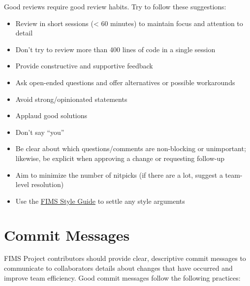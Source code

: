 \documentclass[
]{book}
\providecommand{\tightlist}{%
  \setlength{\itemsep}{0pt}\setlength{\parskip}{0pt}}
\begin{document}
Good reviews require good review habits. Try to follow these suggestions:

\begin{itemize}
\tightlist
\item
  Review in short sessions (\textless{} 60 minutes) to maintain focus and attention to detail
\item
  Don't try to review more than 400 lines of code in a single session
\item
  Provide constructive and supportive feedback
\item
  Ask open-ended questions and offer alternatives or possible workarounds
\item
  Avoid strong/opinionated statements
\item
  Applaud good solutions
\item
  Don't say ``you''
\item
  Be clear about which questions/comments are non-blocking or unimportant; likewise, be explicit when approving a change or requesting follow-up
\item
  Aim to minimize the number of nitpicks (if there are a lot, suggest a team-level resolution)
\item
  Use the \href{https://noaa-fims.github.io/collaborative_workflow/style-guide.html}{FIMS Style Guide} to settle any style arguments
\end{itemize}

\hypertarget{commit-messages}{%
\section{Commit Messages}\label{commit-messages}}

FIMS Project contributors should provide clear, descriptive commit messages to communicate to collaborators details about changes that have occurred and improve team efficiency. Good commit messages follow the following practices:
\end{document}
